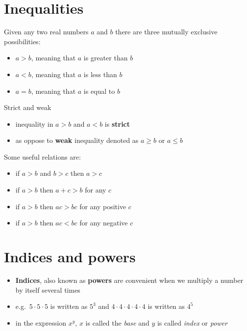 \documentclass[
]{book}
\providecommand{\tightlist}{%
  \setlength{\itemsep}{0pt}\setlength{\parskip}{0pt}}
\theoremstyle{definition}
\theoremstyle{definition}
\theoremstyle{definition}
\theoremstyle{remark}
\begin{document}
\hypertarget{inequalities}{%
\section{Inequalities}\label{inequalities}}

Given any two real numbers \(a\) and \(b\) there are three mutually exclusive possibilities:

\begin{itemize}
\tightlist
\item
  \(a > b\), meaning that \(a\) is greater than \(b\)
\item
  \(a < b\), meaning that \(a\) is less than \(b\)
\item
  \(a = b\), meaning that \(a\) is equal to \(b\)
\end{itemize}

Strict and weak

\begin{itemize}
\tightlist
\item
  inequality in \(a > b\) and \(a < b\) is \textbf{strict}
\item
  as oppose to \textbf{weak} inequality denoted as \(a \ge b\) or \(a \le b\)
\end{itemize}

Some useful relations are:

\begin{itemize}
\tightlist
\item
  if \(a > b\) and \(b > c\) then \(a > c\)
\item
  if \(a > b\) then \(a + c > b\) for any \(c\)
\item
  if \(a > b\) then \(ac > bc\) for any positive \(c\)
\item
  if \(a > b\) then \(ac < bc\) for any negative \(c\)
\end{itemize}

\hypertarget{indices-and-powers}{%
\section{Indices and powers}\label{indices-and-powers}}

\begin{itemize}
\tightlist
\item
  \textbf{Indices}, also known as \textbf{powers} are convenient when we multiply a number by itself several times
\item
  e.g.~\(5 \cdot 5 \cdot 5\) is written as \(5^3\) and \(4 \cdot 4 \cdot 4 \cdot 4 \cdot 4\) is written as \(4^5\)
\item
  in the expression \(x^y\), \(x\) is called the \emph{base} and \(y\) is called \emph{index} or \emph{power}
\end{itemize}
\end{document}
